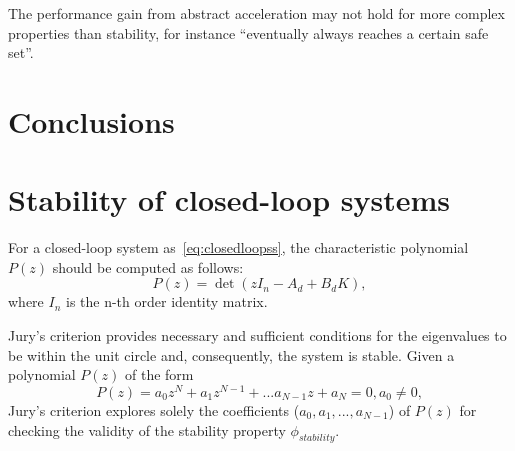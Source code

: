 \documentclass[runningheads,a4paper]{llncs}
\newcommand{\addtodo}[1]{{\color{red} TODO: #1}}
\begin{document}
The performance gain from abstract acceleration may not hold for more complex properties than stability, for instance ``eventually always reaches a certain safe set''. 





\section{Conclusions}


\newpage


  

\newpage
\appendix
\section{Stability of closed-loop systems}
\label{sec:appendix-stability}


For a closed-loop system as~\eqref{eq:closedloopss}, 
the characteristic polynomial $P(z)$ should be computed as follows:
\begin{equation}
P(z)= \det( z I_{n} - A_d + B_d K ),
\end{equation}
where $I_{n}$ is the n-th order identity matrix. 

Jury's criterion provides necessary and sufficient conditions for the eigenvalues 
to be within the unit circle and, consequently, the system is stable.  Given a 
polynomial $P(z)$ of the form
$$
P(z) = a_{0}z^{N} + a_{1}z^{N-1} + ... a_{N-1}z + a_{N} = 0, a_{0}\neq 0,
$$
Jury's criterion explores solely the coefficients ($a_{0},a_{1},...,a_{N-1}$) 
of $P(z)$ for checking the validity of the stability property $\phi_{stability}$. 
\end{document}
